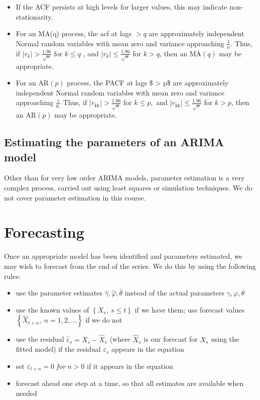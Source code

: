 \documentclass[12pt,a4paper,openany,twoside]{report}
\theoremstyle{definition}
\theoremstyle{remark}
\theoremstyle{plain}
\theoremstyle{definition}
\theoremstyle{definition}
\theoremstyle{definition}
\theoremstyle{remark}
\begin{document}
\begin{itemize}
\item
  If the ACF persists at high levels for larger values, this may indicate
  non-stationarity.
\item
  For an MA(q) process, the acf at lags \(> q\) are approximately
  independent Normal random variables with mean zero and variance
  approaching \(\frac{1}{n}\). Thus, if
  \(\left| r_{k} \right| > \frac{1.96}{\sqrt{n}}\) for \(k \leq q\) , and
  \(\left| r_{k} \right| \leq \frac{1.96}{\sqrt{n}}\) for \(k > q\), then
  an \(\text{MA}\left( q \right)\) may be appropriate.
\item
  For an \(\text{AR}\left( p \right)\) process, the PACF at lags
  \$ \textgreater{} p\$ are approximately independent Normal random
  variables with mean zero and variance approaching
  \(\frac{1}{\text{n.}}\) Thus, if
  \(\left| r_{\text{kk}} \right| > \frac{1.96}{\sqrt{n}}\) for
  \(k \leq p,\) and
  \(\left| r_{\text{kk}} \right| \leq \frac{1.96}{\sqrt{n}}\) for
  \(k > p\), then an \(\text{AR}\left( p \right)\) may be appropriate.
\end{itemize}

\hypertarget{arimaparest}{%
\subsection{Estimating the parameters of an ARIMA model}\label{arimaparest}}

Other than for very low order ARIMA models, parameter estimation is a
very complex process, carried out using least squares or simulation
techniques. We do not cover parameter estimation in this course.

\hypertarget{arimafore}{%
\section{Forecasting}\label{arimafore}}

Once an appropriate model has been identified and parameters estimated, we may wish to forecast from the end of the series. We do this by using the following rules:

\begin{itemize}
\item
  use the parameter estimates \(\hat{\gamma},\hat{\varphi},\hat{\theta}\)
  instead of the actual parameters \(\gamma, \varphi , \theta\)
\item
  use the known values of \(\left\{ X_{s},\ s \leq t \right\}\) if we have them; use forecast values
  \(\left\{ {\hat{X}}_{t + n},\ n = 1,2,\ldots \right\}\) if we do not
\item
  use the residual \({\hat{\varepsilon}}_{s} = X_{s} - {\hat{X}}_{s}\) (where \({\hat{X}}_{s}\) is our forecast for \(X_{s}\) using the fitted model) if the residual \(\varepsilon_{s}\) appears in the equation
\item
  set \(\varepsilon_{t + n} = 0\ for\ n > 0\) if it appears in the equation
\item
  forecast ahead one step at a time, so that all estimates are available when needed
\end{itemize}
\end{document}
